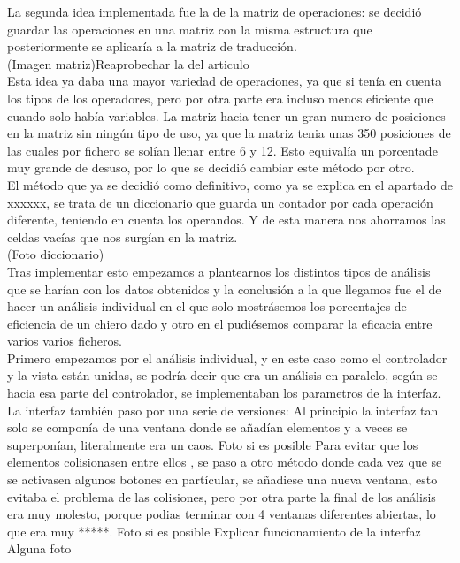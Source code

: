 La segunda idea implementada fue la de la  matriz de operaciones: se decidió guardar las operaciones en una matriz con la misma estructura que posteriormente se aplicaría a la matriz de traducción.\\
(Imagen matriz)Reaprobechar la del articulo\\
Esta idea ya daba una mayor variedad de operaciones, ya que si tenía en cuenta los tipos de los operadores, pero por otra parte era incluso menos eficiente que cuando solo había variables. La matriz hacia tener un gran numero de posiciones en la matriz sin ningún tipo de uso, ya que la matriz tenia unas 350 posiciones de las cuales por fichero se solían llenar entre 6 y 12. Esto equivalía un porcentade muy grande de desuso, por lo que se decidió cambiar este método por otro.\\
El método que ya se decidió como definitivo, como ya se explica en el apartado de  xxxxxx, se trata de  un diccionario que guarda un contador por cada operación diferente, teniendo en cuenta los operandos. Y de esta manera nos ahorramos las celdas vacías que nos surgían en la matriz.\\
(Foto diccionario)\\
Tras implementar esto empezamos a plantearnos los distintos tipos de análisis que se harían con los datos obtenidos y la conclusión a la que llegamos fue el  de hacer un análisis individual en el que solo mostrásemos los porcentajes de eficiencia de un chiero dado y otro en el pudiésemos comparar la eficacia entre varios varios ficheros.\\
Primero  empezamos por el análisis individual, y en este caso como el controlador y la vista están unidas, se podría  decir que era un análisis en paralelo, según se hacia esa parte del controlador, se implementaban los parametros de la interfaz.\\
La interfaz también paso por una serie de versiones:
 Al principio la interfaz tan solo se componía de una ventana donde se añadían elementos  y a veces se  superponían, literalmente era un caos.  
Foto si es posible
Para evitar que los elementos colisionasen entre ellos , se paso a otro  método donde cada vez que se se activasen algunos botones en partícular, se añadiese una nueva ventana, esto  evitaba el problema de las colisiones, pero por otra parte la final de los análisis era muy molesto, porque  podias terminar con 4 ventanas diferentes abiertas, lo que era muy *****.
Foto si es posible
Explicar funcionamiento de la interfaz
Alguna foto

